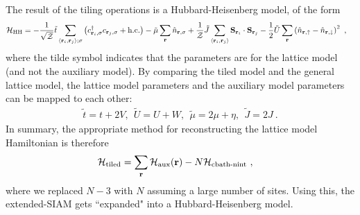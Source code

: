 \documentclass[reprint,hidelinks,onecolumn]{revtex4-2}
\begin{document}
The result of the tiling operations is a Hubbard-Heisenberg model, of the form
\begin{equation}\begin{aligned}
	\mathcal{H}_\text{HH} &= -\frac{1}{\sqrt\mathcal{Z}}\tilde t\sum_{\left<{\bf r}_i, {\bf r}_j\right>;\sigma}\left(c^\dagger_{{\bf r}_i,\sigma}c_{{\bf r}_j,\sigma} + \text{h.c.}\right) - \tilde \mu \sum_{{\bf r}}\hat n_{{\bf r},\sigma} + \frac{1}{\mathcal{Z}}\tilde J\sum_{\left< {\bf r}_i, {\bf r}_j\right>}{\bf S}_{{\bf r}_i}\cdot{\bf S}_{{\bf r}_j} - \frac{1}{2}\tilde U\sum_{\bf r}\left(\hat n_{{\bf r} , \uparrow} - \hat n_{{\bf r} , \downarrow}\right)^2  ~,
\end{aligned}\end{equation}
where the tilde symbol indicates that the parameters are for the lattice model (and not the auxiliary model). By comparing the tiled model and the general lattice model, the lattice model parameters and the auxiliary model parameters can be mapped to each other:
\begin{equation}\begin{aligned}\label{couplingsMappings}
	\tilde t = t+2V,~~ \tilde U = U + W, ~ ~ \tilde \mu = 2\mu + \eta,~ ~ \tilde J = 2J~.
\end{aligned}\end{equation}
In summary, the appropriate method for reconstructing the lattice model Hamiltonian is therefore
\begin{equation}\begin{aligned}\label{tilingPrescriptionFinal}
	\mathcal{H}_\text{tiled} &= \sum_{{\bf r}}\mathcal{H}_\text{aux}({\bf r}) - N\mathcal{H}_\text{cbath-nint}~,
\end{aligned}\end{equation}
where we replaced \(N-3\) with \(N\) assuming a large number of sites. Using this, the extended-SIAM gets ``expanded" into a Hubbard-Heisenberg model.
\end{document}
